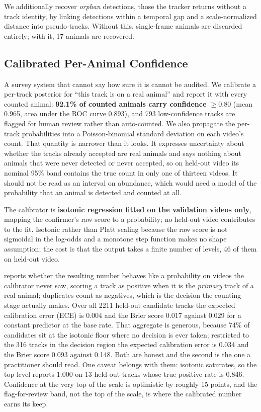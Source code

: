 We additionally recover \emph{orphan} detections, those the tracker returns without a
track identity, by linking detections within a temporal gap and a scale-normalized
distance into pseudo-tracks. Without this, single-frame animals are discarded entirely; with
it, 17 animals are recovered.

\subsection{Calibrated Per-Animal Confidence}
\label{sec:calibration}

A survey system that cannot say how sure it is cannot be audited. We calibrate a per-track
posterior for ``this track is on a real animal'' and report it with every counted animal:
\textbf{92.1\% of counted animals carry confidence $\ge0.80$} (mean 0.965, area under the ROC curve 0.893), and
793 low-confidence tracks are flagged for human review rather than auto-counted. We also propagate the per-track probabilities into a Poisson-binomial standard deviation on
each video's count. That quantity is narrower than it looks. It expresses uncertainty about
whether the tracks already accepted are real animals and says nothing about animals that
were never detected or never accepted, so on held-out video its nominal 95\% band contains the
true count in only one of thirteen videos. It should not be read as an interval on abundance,
which would need a model of the probability that an animal is detected and counted at all.

The calibrator is \textbf{isotonic regression fitted on the validation videos only}, mapping
the confirmer's raw score to a probability; no held-out video contributes to the fit. Isotonic
rather than Platt scaling because the raw score is not sigmoidal in the log-odds and a
monotone step function makes no shape assumption; the cost is that the output takes a finite
number of levels, 46 of them on held-out video.

 reports whether the resulting number behaves like a probability on videos the
calibrator never saw, scoring a track as positive when it is the \emph{primary} track of a real animal; duplicates count as negatives, which is the decision the counting stage
actually makes. Over all 2211 held-out candidate tracks the expected calibration error (ECE) is 0.004 and the Brier score 0.017 against 0.029 for a constant predictor at the base rate. That
aggregate is generous, because 74\% of candidates sit at the isotonic floor where no decision
is ever taken; restricted to the 316 tracks in the decision region the expected calibration
error is 0.034 and the Brier score 0.093 against 0.148. Both are honest and the second is the
one a practitioner should read. One caveat belongs with them: isotonic saturates, so the top
level reports 1.000 on 13 held-out tracks whose true positive rate is 0.846. Confidence at the
very top of the scale is optimistic by roughly 15 points, and the flag-for-review band, not
the top of the scale, is where the calibrated number earns its keep.

